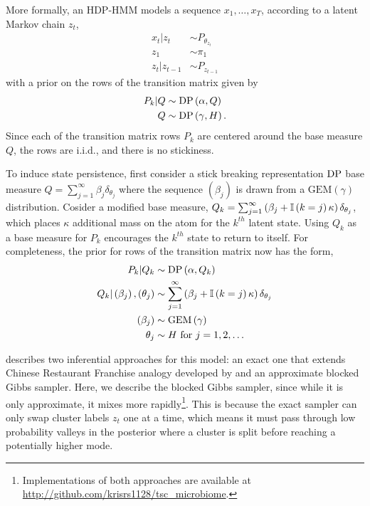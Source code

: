 \documentclass{article}
\begin{document}
More formally, an HDP-HMM models a sequence $x_{1}, \dots, x_{T}$, according to
a latent Markov chain $z_t$,
\begin{align*}
  x_t \vert z_t &\sim P_{\theta_{z_t}} \\
    z_1 &\sim \pi_1 \\
    z_t \vert z_{t - 1} &\sim P_{z_{t - 1}}
\end{align*}
with a prior on the rows of the transition matrix given by
\begin{align*}
  P_k \vert Q &\sim \textnormal{DP}\left(\alpha, Q\right) \\
  Q &\sim \textnormal{DP}\left(\gamma, H\right).
\end{align*}
Since each of the transition matrix rows $P_k$ are centered around the base
measure $Q$, the rows are i.i.d., and there is no stickiness.

To induce state persistence, first consider a stick breaking representation
$\textnormal{DP}$ base measure $Q = \sum_{j = 1}^{\infty} \beta_j \delta_{\theta_j}$ where
the sequence $\left(\beta_j\right)$ is drawn from a
$\text{GEM}\left(\gamma\right)$ distribution. Cosider a modified base measure,
$Q_k = \sum_{j = 1}^{\infty} \left(\beta_j + \mathbb{I}\left({k =
    j}\right)\kappa\right)\delta_{\theta_j}$, which places $\kappa$ additional mass on
  the atom for the $k^{th}$ latent state. Using $Q_k$ as a base measure for
  $P_k$ encourages the $k^{th}$ state to return to itself. For completeness, the
  prior for rows of the transition matrix now has the form,
\begin{align*}
  P_k \vert Q_k &\sim \textnormal{DP}\left(\alpha, Q_k\right) \\
  Q_k \vert \left(\beta_j\right), \left(\theta_j\right) &\sim \sum_{j = 1}^{\infty} \left(\beta_j + \mathbb{I}\left({k = j}\right)\kappa\right)\delta_{\theta_j} \\
  \left(\beta_j\right) &\sim \text{GEM}\left(\gamma\right) \\
  \theta_j &\sim H \text{ for }j = 1, 2, \dots
\end{align*}

\citep{fox2009bayesian} describes two inferential approaches for this model: an
exact one that extends Chinese Restaurant Franchise analogy developed by
\citep{teh2006hierarchical} and an approximate blocked Gibbs sampler. Here, we
describe the blocked Gibbs sampler, since while it is only approximate, it mixes
more rapidly\footnote{Implementations of both approaches are available at
  \url{http://github.com/krisrs1128/tsc\_microbiome}.}. This is because the exact
  sampler can only swap cluster labels $z_t$ one at a time, which means it must
  pass through low probability valleys in the posterior where a cluster is split
  before reaching a potentially higher mode.
\end{document}

